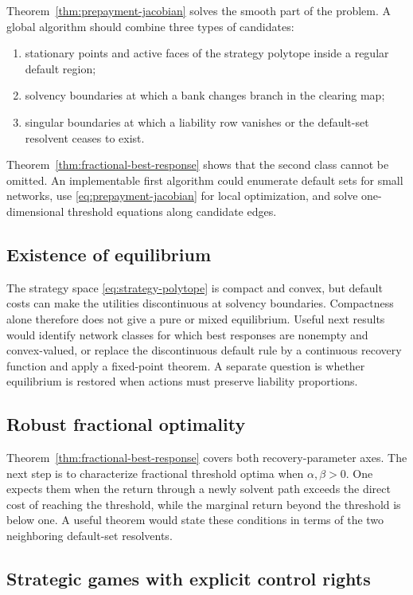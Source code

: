 \documentclass[11pt]{article}
\theoremstyle{definition}
\theoremstyle{remark}
\begin{document}
Theorem~\ref{thm:prepayment-jacobian} solves the smooth part of the problem.
A global algorithm should combine three types of candidates:
\begin{enumerate}[label=(\roman*)]
  \item stationary points and active faces of the strategy polytope inside a
  regular default region;
  \item solvency boundaries at which a bank changes branch in the clearing
  map;
  \item singular boundaries at which a liability row vanishes or the
  default-set resolvent ceases to exist.
\end{enumerate}
Theorem~\ref{thm:fractional-best-response} shows that the second class cannot
be omitted.  An implementable first algorithm could enumerate default sets for
small networks, use \eqref{eq:prepayment-jacobian} for local optimization, and
solve one-dimensional threshold equations along candidate edges.

\subsection{Existence of equilibrium}

The strategy space \eqref{eq:strategy-polytope} is compact and convex, but
default costs can make the utilities discontinuous at solvency boundaries.
Compactness alone therefore does not give a pure or mixed equilibrium.  Useful
next results would identify network classes for which best responses are
nonempty and convex-valued, or replace the discontinuous default rule by a
continuous recovery function and apply a fixed-point theorem.  A separate
question is whether equilibrium is restored when actions must preserve
liability proportions.

\subsection{Robust fractional optimality}

Theorem~\ref{thm:fractional-best-response} covers both recovery-parameter axes.
The next step is to characterize fractional threshold optima when
$\alpha,\beta>0$.  One expects them when the return through a newly solvent
path exceeds the direct cost of reaching the threshold, while the marginal
return beyond the threshold is below one.  A useful theorem would state these
conditions in terms of the two neighboring default-set resolvents.

\subsection{Strategic games with explicit control rights}
\end{document}
